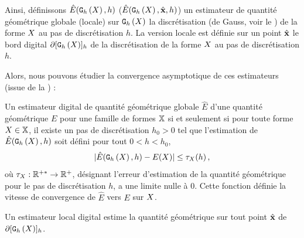 Ainsi, définissons $\hat{E}(\mathtt{G}_{h}\left(X\right),h)$ (\respp $\hat{E}(\mathtt{G}_{h}\left(X\right),\hat{\mathbf{x}},h)$) un
estimateur de quantité géométrique globale (\resp locale) sur $\mathtt{G}_{h}\left(X\right)$ la
discrétisation (de Gauss, voir le ) de la forme
$X$ au pas de discrétisation $h$. La version locale est définie sur un
point $\hat{\mathbf{x}}$ le bord digital $\partial\lbrack \mathtt{G}_{h}\left(X\right) \rbrack_{h}$ de la discrétisation
de la forme $X$ au pas de discrétisation $h$.


Alors, nous pouvons étudier la convergence asymptotique de ces estimateurs
(issue de la ) :
%
\begin{definition}{}
  \label{def:multigrid-convergence-global}
  Un estimateur digital de quantité géométrique globale $\hat{E}$ d'une quantité géométrique
  $E$  pour une famille de formes $\mathbb{X}$ si
  et seulement si pour toute forme $X \in \mathbb{X}$, il existe un pas de
  discrétisation $h_0 > 0$ tel que l'estimation de $\hat{E}(\mathtt{G}_{h}\left(X\right),h)$
  soit défini pour tout $0 < h < h_0$,
  \begin{equation}
    | \hat{E}(\mathtt{G}_{h}\left(X\right),h) - E(X) | \le \tau_{X}(h) \,,
  \end{equation}
  où $\tau_{X}: \mathbb{R}^{+*} \rightarrow \mathbb{R}^+$, désignant l'erreur d'estimation
  de la quantité géométrique pour le pas de discrétisation $h$, a une limite
  nulle à $0$. Cette fonction définie la vitesse de convergence de $\hat{E}$
  vers $E$ sur $X$.
\end{definition}
%
%
Un estimateur local digital estime la quantité géométrique sur tout point
$\hat{\mathbf{x}}$ de $\partial\lbrack \mathtt{G}_{h}\left(X\right) \rbrack_{h}$.
%
